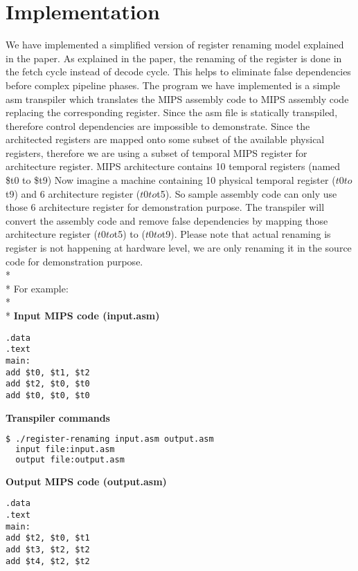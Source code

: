 \chapter{Implementation}

We have implemented a simplified version of register renaming model explained in the paper.
As explained in the paper, the renaming of the register is done in the fetch cycle instead of decode cycle. This helps to eliminate false dependencies before complex pipeline phases. The program we have implemented is a simple asm transpiler which translates the MIPS assembly code to MIPS assembly code replacing the corresponding register. Since the asm file is statically transpiled, therefore control dependencies are impossible to demonstrate.
Since the architected registers are mapped onto some subset of the available physical registers, therefore we are using a subset of temporal MIPS register for architecture register.
MIPS architecture contains 10 temporal registers (named \$t0 to \$t9)
Now imagine a machine containing 10 physical temporal  register ($t0 to $t9) and 6 architecture register ($t0 to $t5). So sample assembly code can only use those 6 architecture register for demonstration purpose. The transpiler will convert the assembly code and remove false dependencies by mapping those architecture register ($t0 to $t5) to ($t0 to $t9). Please note that actual renaming is register is not happening at hardware level, we are only renaming it in the source code for demonstration purpose. \\* \\*
For example: \\* \\*
\textbf{Input MIPS code (input.asm)}

\begin{lstlisting}
.data
.text
main:
add $t0, $t1, $t2
add $t2, $t0, $t0
add $t0, $t0, $t0
\end{lstlisting}

\textbf{Transpiler commands}

\begin{lstlisting}[language=bash]
  $ ./register-renaming input.asm output.asm
  input file:input.asm
  output file:output.asm
\end{lstlisting}

\textbf{Output MIPS code (output.asm)}

\begin{lstlisting}
.data
.text
main:
add $t2, $t0, $t1
add $t3, $t2, $t2
add $t4, $t2, $t2
\end{lstlisting}